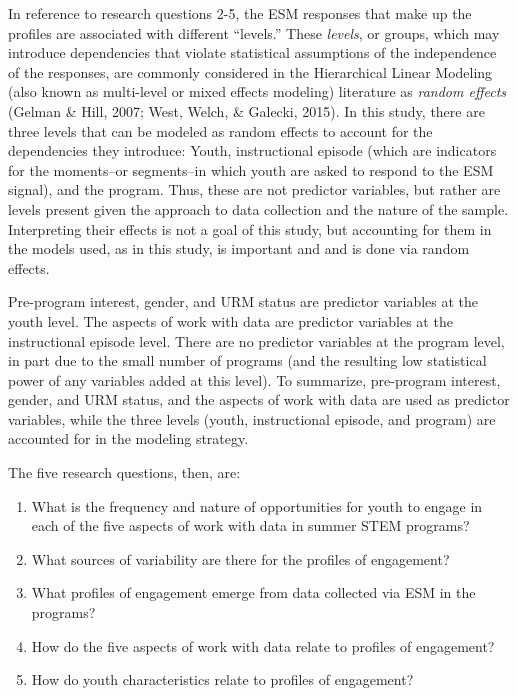 \documentclass[]{msu-thesis}
\providecommand{\tightlist}{%
  \setlength{\itemsep}{0pt}\setlength{\parskip}{0pt}}
\theoremstyle{definition}
\theoremstyle{definition}
\theoremstyle{definition}
\theoremstyle{remark}
\begin{document}
In reference to research questions 2-5, the ESM responses that make up
the profiles are associated with different ``levels.'' These
\emph{levels}, or groups, which may introduce dependencies that violate
statistical assumptions of the independence of the responses, are
commonly considered in the Hierarchical Linear Modeling (also known as
multi-level or mixed effects modeling) literature as \emph{random
effects} (Gelman \& Hill, 2007; West, Welch, \& Galecki, 2015). In this
study, there are three levels that can be modeled as random effects to
account for the dependencies they introduce: Youth, instructional
episode (which are indicators for the moments--or segments--in which
youth are asked to respond to the ESM signal), and the program. Thus,
these are not predictor variables, but rather are levels present given
the approach to data collection and the nature of the sample.
Interpreting their effects is not a goal of this study, but accounting
for them in the models used, as in this study, is important and and is
done via random effects.

Pre-program interest, gender, and URM status are predictor variables at
the youth level. The aspects of work with data are predictor variables
at the instructional episode level. There are no predictor variables at
the program level, in part due to the small number of programs (and the
resulting low statistical power of any variables added at this level).
To summarize, pre-program interest, gender, and URM status, and the
aspects of work with data are used as predictor variables, while the
three levels (youth, instructional episode, and program) are accounted
for in the modeling strategy.

The five research questions, then, are:

\begin{enumerate}
\def\labelenumi{\arabic{enumi}.}
\tightlist
\item
  What is the frequency and nature of opportunities for youth to engage
  in each of the five aspects of work with data in summer STEM programs?
\item
  What sources of variability are there for the profiles of engagement?
\item
  What profiles of engagement emerge from data collected via ESM in the
  programs?
\item
  How do the five aspects of work with data relate to profiles of
  engagement?
\item
  How do youth characteristics relate to profiles of engagement?
\end{enumerate}
\end{document}
